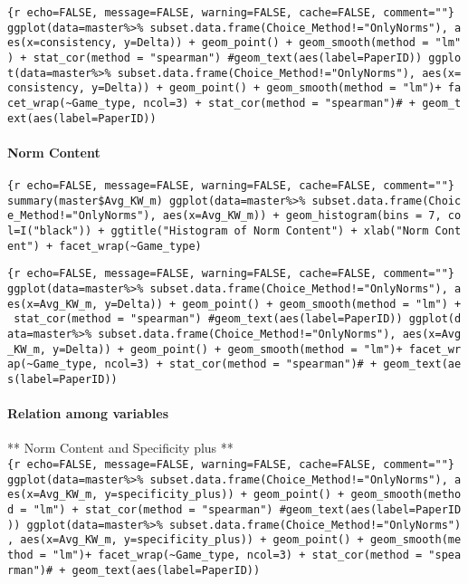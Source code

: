 \texttt{\{r\ echo=FALSE,\ message=FALSE,\ warning=FALSE,\ cache=FALSE,\ comment=""\}\ ggplot(data=master\%\textgreater{}\%\ subset.data.frame(Choice\_Method!="OnlyNorms"),\ aes(x=consistency,\ y=Delta))\ +\ geom\_point()\ +\ geom\_smooth(method\ =\ "lm")\ +\ stat\_cor(method\ =\ "spearman")\ \#geom\_text(aes(label=PaperID))\ ggplot(data=master\%\textgreater{}\%\ subset.data.frame(Choice\_Method!="OnlyNorms"),\ aes(x=consistency,\ y=Delta))\ +\ geom\_point()\ +\ geom\_smooth(method\ =\ "lm")+\ facet\_wrap(\textasciitilde{}Game\_type,\ ncol=3)\ +\ stat\_cor(method\ =\ "spearman")\#\ +\ geom\_text(aes(label=PaperID))}

\hypertarget{norm-content}{%
\paragraph{Norm Content}\label{norm-content}}

\texttt{\{r\ echo=FALSE,\ message=FALSE,\ warning=FALSE,\ cache=FALSE,\ comment=""\}\ summary(master\$Avg\_KW\_m)\ ggplot(data=master\%\textgreater{}\%\ subset.data.frame(Choice\_Method!="OnlyNorms"),\ aes(x=Avg\_KW\_m))\ +\ geom\_histogram(bins\ =\ 7,\ col=I("black"))\ +\ ggtitle("Histogram\ of\ Norm\ Content")\ +\ xlab("Norm\ Content")\ +\ facet\_wrap(\textasciitilde{}Game\_type)}

\texttt{\{r\ echo=FALSE,\ message=FALSE,\ warning=FALSE,\ cache=FALSE,\ comment=""\}\ ggplot(data=master\%\textgreater{}\%\ subset.data.frame(Choice\_Method!="OnlyNorms"),\ aes(x=Avg\_KW\_m,\ y=Delta))\ +\ geom\_point()\ +\ geom\_smooth(method\ =\ "lm")\ +\ stat\_cor(method\ =\ "spearman")\ \#geom\_text(aes(label=PaperID))\ ggplot(data=master\%\textgreater{}\%\ subset.data.frame(Choice\_Method!="OnlyNorms"),\ aes(x=Avg\_KW\_m,\ y=Delta))\ +\ geom\_point()\ +\ geom\_smooth(method\ =\ "lm")+\ facet\_wrap(\textasciitilde{}Game\_type,\ ncol=3)\ +\ stat\_cor(method\ =\ "spearman")\#\ +\ geom\_text(aes(label=PaperID))}

\hypertarget{relation-among-variables}{%
\paragraph{Relation among variables}\label{relation-among-variables}}

** Norm Content and Specificity plus **
\texttt{\{r\ echo=FALSE,\ message=FALSE,\ warning=FALSE,\ cache=FALSE,\ comment=""\}\ ggplot(data=master\%\textgreater{}\%\ subset.data.frame(Choice\_Method!="OnlyNorms"),\ aes(x=Avg\_KW\_m,\ y=specificity\_plus))\ +\ geom\_point()\ +\ geom\_smooth(method\ =\ "lm")\ +\ stat\_cor(method\ =\ "spearman")\ \#geom\_text(aes(label=PaperID))\ ggplot(data=master\%\textgreater{}\%\ subset.data.frame(Choice\_Method!="OnlyNorms"),\ aes(x=Avg\_KW\_m,\ y=specificity\_plus))\ +\ geom\_point()\ +\ geom\_smooth(method\ =\ "lm")+\ facet\_wrap(\textasciitilde{}Game\_type,\ ncol=3)\ +\ stat\_cor(method\ =\ "spearman")\#\ +\ geom\_text(aes(label=PaperID))}

